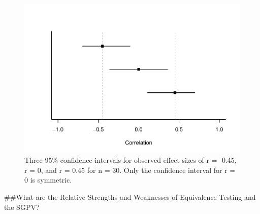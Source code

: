 \documentclass[,man,floatsintext]{apa6}
\begin{document}
\begin{figure}
\centering
\includegraphics{manuscript_files/figure-latex/TOSTSGPV12-1.pdf}
\caption{\label{fig:TOSTSGPV12}Three 95\% confidence intervals for observed effect sizes of r = -0.45, r = 0, and r = 0.45 for n = 30. Only the confidence interval for r = 0 is symmetric.}
\end{figure}

\#\#What are the Relative Strengths and Weaknesses of Equivalence Testing and the SGPV?
\end{document}
